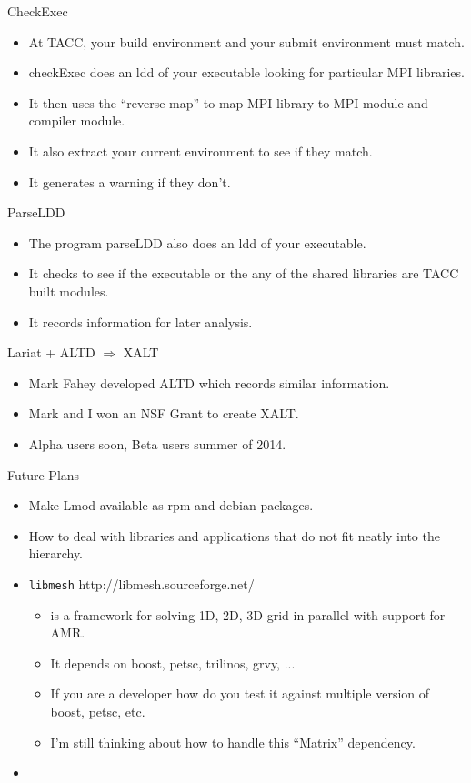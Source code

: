 \documentclass{beamer}
\begin{document}
\begin{frame}{CheckExec}
  \begin{itemize}
    \item At TACC, your build environment and your submit environment
      must match.
    \item checkExec does an ldd of your executable looking for particular MPI libraries.
    \item It then uses the ``reverse map'' to map MPI library to MPI
      module and compiler module.
    \item It also extract your current environment to see if they match.
    \item It generates a warning if they don't.
  \end{itemize}
\end{frame}

\begin{frame}{ParseLDD}
  \begin{itemize}
    \item The program parseLDD also does an ldd of your executable.
    \item It checks to see if the executable or the any of the shared
      libraries are TACC built modules.
    \item It records information for later analysis.
  \end{itemize}
\end{frame}

\begin{frame}{Lariat + ALTD $\Rightarrow$ XALT}
  \begin{itemize}
    \item Mark Fahey developed ALTD which records similar information.
    \item Mark and I won an NSF Grant to create XALT.
    \item Alpha users soon, Beta users summer of 2014.
  \end{itemize}
\end{frame}
\begin{frame}{Future Plans}
  \begin{itemize}
    \item Make Lmod available as rpm and debian packages.
    \item How to deal with libraries and applications that do not fit
      neatly into the hierarchy.
    \item \texttt{libmesh} http://libmesh.sourceforge.net/
      \begin{itemize}
        \item is a framework for solving 1D, 2D, 3D grid
          in parallel with support for AMR.
        \item It depends on boost, petsc, trilinos, grvy, ...
        \item If you are a developer how do you test it against
          multiple version of boost, petsc, etc.
        \item I'm still thinking about how to handle this ``Matrix'' dependency.
      \end{itemize}
    \item 
  \end{itemize}
\end{frame}
\end{document}
